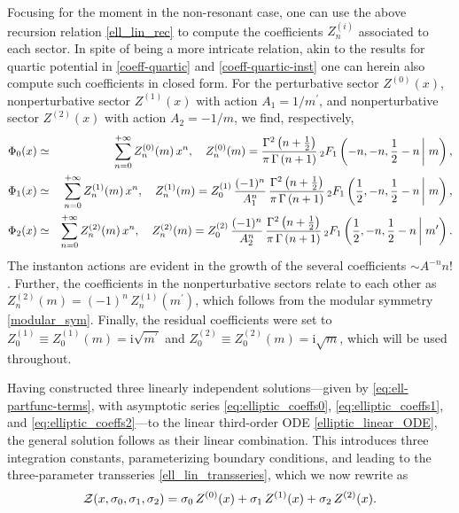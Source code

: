\documentclass[11pt,a4paper]{article}
\newcommand{\CZ}{{\cal Z}}
\newcommand{\be}{\begin{equation}}
\newcommand{\ee}{\end{equation}}
\newcommand{\bea}{\begin{eqnarray}}
\newcommand{\eea}{\end{eqnarray}}
\newcommand{\rmi}{{\mathrm{i}}}
\begin{document}
Focusing for the moment in the non-resonant case, one can use the above recursion relation \eqref{ell_lin_rec} to compute the coefficients $Z^{(i)}_n$ associated to each sector. In spite of being a more intricate relation, akin to the results for quartic potential in \eqref{coeff-quartic} and \eqref{coeff-quartic-inst} one can herein also compute such coefficients in closed form. For the perturbative sector $Z^{(0)}(x)$, nonperturbative sector $Z^{(1)}(x)$ with action $A_1=1/m^\prime$, and nonperturbative sector $Z^{(2)}(x)$ with action $A_2=-1/m$, we find, respectively,
%
\bea
\Phi_0 (x) &\simeq& \sum_{n=0}^{+\infty} Z^{(0)}_n (m)\, x^{n}, \quad Z^{(0)}_n (m) = \frac{\Gamma^2\left(n+\frac{1}{2}\right)}{\pi\, \Gamma\left(n+1\right)}\, {}_2 F_{1} \left( -n, -n, \frac{1}{2}-n\, \right| \left. \vphantom{\frac{1}{2}} m \right),
\label{eq:elliptic_coeffs0} \\
\Phi_1 (x) &\simeq& \sum_{n=0}^{+\infty} Z^{(1)}_n (m)\, x^{n}, \quad Z^{(1)}_n (m) = Z^{(1)}_0\, \frac{(-1)^n}{A_1^n}\, \frac{\Gamma^2\left(n+\frac{1}{2}\right)}{\pi\, \Gamma\left(n+1\right)}\, {}_2 F_{1} \left( \frac{1}{2}, -n, \frac{1}{2}-n\, \right| \left. \vphantom{\frac{1}{2}} m \right),
\label{eq:elliptic_coeffs1} \\
\Phi_2 (x) &\simeq& \sum_{n=0}^{+\infty} Z^{(2)}_n (m)\, x^{n}, \quad Z^{(2)}_n (m) = Z^{(2)}_0\, \frac{(-1)^n}{A_2^n}\, \frac{\Gamma^2\left(n+\frac{1}{2}\right)}{\pi\, \Gamma\left(n+1\right)}\, {}_2 F_{1} \left( \frac{1}{2}, -n, \frac{1}{2}-n\, \right| \left. \vphantom{\frac{1}{2}} m^\prime \right).
\label{eq:elliptic_coeffs2}
\eea
%
\noindent
The instanton actions are evident in the growth of the several coefficients $\sim A^{-n} n!$. Further, the coefficients in the nonperturbative sectors relate to each other as $Z^{(2)}_n (m) = (-1)^n\, Z^{(1)}_n(m^\prime)$, which follows from the modular symmetry \eqref{modular_sym}. Finally, the residual coefficients were set to $Z^{(1)}_0 \equiv Z^{(1)}_0 (m) = \rmi\sqrt{m^\prime}$ and $Z^{(2)}_0 \equiv Z^{(2)}_0 (m) = \rmi\sqrt{m}$, which will be used throughout. 

Having constructed three linearly independent solutions---given by \eqref{eq:ell-partfunc-terms}, with asymptotic series \eqref{eq:elliptic_coeffs0}, \eqref{eq:elliptic_coeffs1}, and \eqref{eq:elliptic_coeffs2}---to the linear third-order ODE \eqref{elliptic_linear_ODE}, the general solution follows as their linear combination. This introduces three integration constants, parameterizing boundary conditions, and leading to the three-parameter transseries \eqref{ell_lin_transseries}, which we now rewrite as
%
\be
\label{ell_lin_transseries-v2}
\CZ (x, \sigma_0, \sigma_1, \sigma_2 ) = \sigma_0\, Z^{(0)}(x) + \sigma_1\, Z^{(1)}(x) + \sigma_2\, Z^{(2)}(x).
\ee
\end{document}
